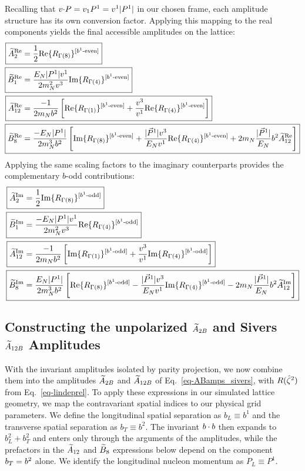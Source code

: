 Recalling that $v {\cdot} P = v_1 P^1 = v^1 |P^1|$ in our chosen frame, each amplitude structure has its own conversion factor. Applying this mapping to the real components yields the final accessible amplitudes on the lattice:
\begin{align}
    \Aboxed{\tAmp^{\text{Re}}_2 = & \frac{1}{2}\text{Re}\{ R_{\Gamma(8)}\}^{[b^{1}\text{-even}]} }\\
    \Aboxed{\tBmp^{\text{Re}}_1 = & \frac{E_{N}|P^1|v^1}{2\mN^2  v^3} \text{Im}\{ R_{\Gamma(4)}\}^{[b^{1}\text{-even}]}}\\
    \Aboxed{\tAmp^{\text{Re}}_{12}=&\frac{-1}{2\mN  \bvec^2}\left[\text{Re}\{ R_{\Gamma(1)}\}^{[b^{1}\text{-even}]}+\frac{v^3}{v^1}\text{Re}\{ R_{\Gamma(4)}\}^{[b^{1}\text{-even}]}\right]}\\
    \Aboxed{\tBmp^{\text{Re}}_8=&\frac{-E_N |P^1|}{ 2\mN^3 \bvec^2 }\left[\text{Im}\{ R_{\Gamma(8)}\}^{[b^{1}\text{-even}]}+\frac{|\vec{P}^1|v^3}{E_N v^1}\text{Re}\{ R_{\Gamma(4)}\}^{[b^{1}\text{-even}]}+ 2\mN  \frac{|\vec{P}^1|}{E_N} \bvec^2  \tAmp^{\text{Re}}_{12}\right]}
\end{align}
Applying the same scaling factors to the imaginary counterparts provides the complementary $b$-odd contributions:
\begin{align}
    \Aboxed{\tAmp^{\text{Im}}_2 = & \frac{1}{2}\text{Im}\{ R_{\Gamma(8)}\}^{[b^{1}\text{-odd}]} }\\
    \Aboxed{\tBmp^{\text{Im}}_1 = & \frac{-E_{N}|P^1|v^1}{2\mN^2 v^3} \text{Re}\{ R_{\Gamma(4)}\}^{[b^{1}\text{-odd}]}}\\
    \Aboxed{\tAmp^{\text{Im}}_{12}=&\frac{-1}{2\mN  \bvec^2}\left[\text{Im}\{ R_{\Gamma(1)}\}^{[b^{1}\text{-odd}]}+\frac{v^3}{v^1}\text{Im}\{ R_{\Gamma(4)}\}^{[b^{1}\text{-odd}]}\right]}\\
     \Aboxed{\tBmp^{\text{Im}}_8=&\frac{E_N|P^1|}{ 2\mN^3 \bvec^2  }\left[\text{Re}\{ R_{\Gamma(8)}\}^{[b^{1}\text{-odd}]}-\frac{|\vec{P}^1|v^3}{E_N v^1}\text{Im}\{ R_{\Gamma(4)}\}^{[b^{1}\text{-odd}]}- 2\mN  \frac{|\vec{P}^1|}{E_N} \bvec^2  \tAmp^{\text{Im}}_{12}\right]}
\end{align}
\subsection{Constructing the unpolarized \texorpdfstring{$\widetilde{A}_{2B}$}{A2B} and Sivers \texorpdfstring{$\widetilde{A}_{12B}$}{A12B} Amplitudes}
\label{sec:effective_amplitudes}

With the invariant amplitudes isolated by parity projection, we now combine them into the amplitudes $\widetilde{A}_{2B}$ and $\widetilde{A}_{12B}$ of Eq.~\eqref{eq-ABamps_sivers}, with $R({\hat \zeta}^2)$ from Eq.~\eqref{eq-lindeprel}. 
To apply these expressions in our simulated lattice geometry, we map the contravariant spatial indices to our physical grid parameters. We define the longitudinal spatial separation as $b_L \equiv b^1$ and the transverse spatial separation as $b_T \equiv b^2$.
The invariant $b\cdot b$ then expands to $b_L^2 + b_T^2$ and enters only through the arguments of the amplitudes, while the prefactors in the $\widetilde{A}_{12}$ and $\widetilde{B}_8$ expressions below depend on the component $b_T=b^2$ alone. We identify the longitudinal nucleon momentum as $P_L \equiv P^1$. 

